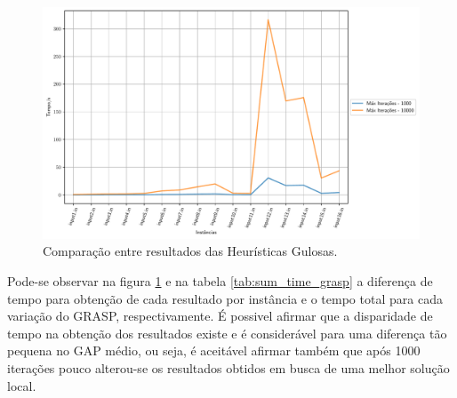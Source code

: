 \documentclass[a4paper, 12pt]{article}
\begin{document}

\begin{figure}[h]
    \centering
    \includegraphics[width=0.7\linewidth]{../imgs/grasp_compare_1kvs10k.pdf}
    \caption{Comparação entre resultados das Heurísticas Gulosas.}
    \label{grasp_compare_1kvs10k}
\end{figure}

Pode-se observar na figura \ref{grasp_compare_1kvs10k} e na tabela \ref{tab:sum_time_grasp} 
a diferença de tempo para obtenção de cada resultado por instância e o tempo total para cada variação do GRASP, respectivamente.
É possivel afirmar que a disparidade 
de tempo na obtenção dos resultados existe e é considerável para uma diferença tão pequena no GAP médio, ou seja, é aceitável
afirmar também que após 1000 iterações pouco alterou-se os resultados obtidos em busca de uma 
melhor solução local. 

\begin{table}[htbp]
    \centering
\end{table}
\end{document}

